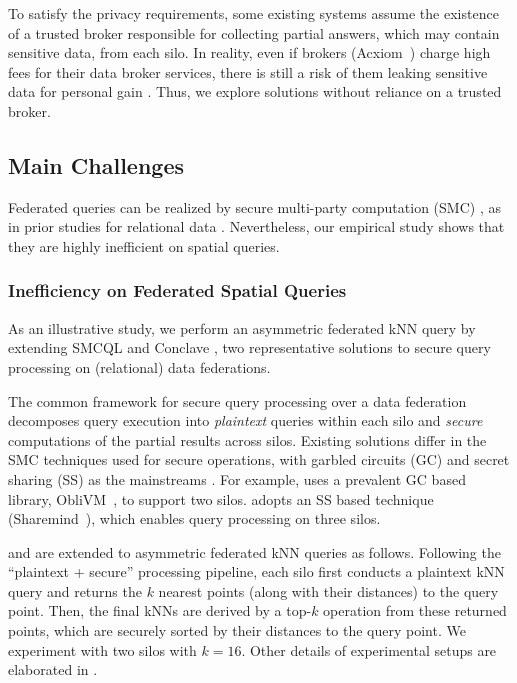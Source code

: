 To satisfy the privacy requirements, 
some existing systems \cite{vldb17smcql,eurosys19conclave} assume the existence of a trusted broker responsible for collecting partial answers, which may contain sensitive data, from each silo.
In reality, even if brokers (\eg Acxiom~\cite{acxiom}) charge high fees for their data broker services, there is still a risk of them leaking sensitive data for personal gain \cite{broker}.
Thus, we explore solutions without reliance on a trusted broker.

\subsection{Main Challenges}
\label{subsec:challenges}

Federated queries can be realized by secure multi-party computation (SMC) \cite{DBLP:journals/ftsec/EvansKR18}, as in prior studies for relational data \cite{vldb17smcql, eurosys19conclave}.
Nevertheless, our empirical study shows that they are highly inefficient on spatial queries.

\subsubsection{Inefficiency on Federated Spatial Queries}
\label{subsubsec:inefficiency}

As an illustrative study, we perform an asymmetric federated kNN query by extending SMCQL \cite{vldb17smcql} and Conclave \cite{eurosys19conclave}, two representative solutions to secure query processing on (relational) data federations.

The common framework \cite{vldb17smcql,eurosys19conclave} for secure query processing over a data federation decomposes query execution into \textit{plaintext} queries within each silo and \textit{secure} computations of the partial results across silos.
Existing solutions differ in the SMC techniques used for secure operations, with garbled circuits (GC) and secret sharing (SS) as the mainstreams \cite{DBLP:journals/ftsec/EvansKR18}.
For example, \smcql \cite{vldb17smcql} uses a prevalent GC based library, ObliVM~\cite{DBLP:conf/sp/LiuWNHS15}, to support two silos.
\conclave \cite{eurosys19conclave} adopts an SS based technique (Sharemind~\cite{DBLP:conf/esorics/BogdanovLW08}), which enables query processing on three silos.

\smcql \cite{vldb17smcql} and \conclave \cite{eurosys19conclave} are extended to asymmetric federated kNN queries as follows.
Following the ``plaintext + secure'' processing pipeline, each silo first conducts a plaintext kNN query and returns the $k$ nearest points (along with their distances) to the query point.
Then, the final kNNs are derived by a top-$k$ operation from these returned points, which are securely sorted by their distances to the query point.
We experiment with two silos with $k = 16$.
Other details of experimental setups are elaborated in .


